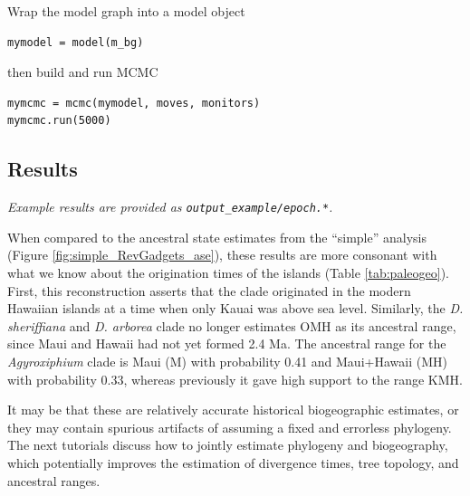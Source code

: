Wrap the model graph into a model object

\begin{snugshade}
\begin{lstlisting}
mymodel = model(m_bg)
\end{lstlisting}
\end{snugshade}

then build and run MCMC

\begin{snugshade}
\begin{lstlisting}
mymcmc = mcmc(mymodel, moves, monitors)
mymcmc.run(5000)
\end{lstlisting}
\end{snugshade}

\subsection*{Results}

{\it Example results are provided as {\tt output\_example/epoch.*}.}

When compared to the ancestral state estimates from the ``simple'' analysis (Figure \ref{fig:simple_RevGadgets_ase}), these results are more consonant with what we know about the origination times of the islands (Table \ref{tab:paleogeo}).
First, this reconstruction asserts that the clade originated in the modern Hawaiian islands at a time when only Kauai was above sea level.
Similarly, the {\it D. sheriffiana} and {\it D. arborea} clade no longer estimates OMH as its ancestral range, since Maui and Hawaii had not yet formed 2.4 Ma.
The ancestral range for the {\it Agyroxiphium} clade is Maui (M) with probability 0.41 and Maui+Hawaii (MH) with probability 0.33, whereas previously it gave high support to the range KMH.

It may be that these are relatively accurate historical biogeographic estimates, or they may contain spurious artifacts of assuming a fixed and errorless phylogeny.
The next tutorials discuss how to jointly estimate phylogeny and biogeography, which potentially improves the estimation of divergence times, tree topology, and ancestral ranges.


